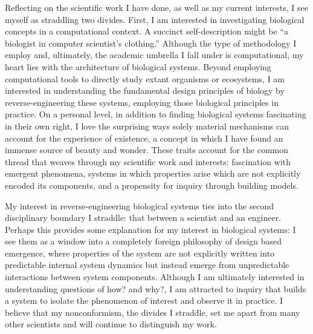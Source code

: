 \documentclass[12pt]{book}
\begin{document}
\maketitle


Reflecting on the scientific work I have done, as well as my current interests, I see myself as straddling two divides. First, I am interested in investigating biological concepts in a computational context. A succinct self-description might be “a biologist in computer scientist’s clothing.”  Although the type of methodology I employ and, ultimately, the academic umbrella I fall under is computational, my heart lies with the architecture of biological systems. Beyond employing computational tools to directly study extant organisms or ecosystems, I am interested in understanding the fundamental design principles of biology by reverse-engineering these systems, employing those biological principles in practice. On a personal level, in addition to finding biological systems fascinating in their own right, I love the surprising ways solely material mechanisms can account for the experience of existence, a concept in which I have found an immense source of beauty and wonder. These traits account for the common thread that weaves through my scientific work and interests: fascination with emergent phenomena, systems in which properties arise which are not explicitly encoded its components, and a propensity for inquiry through building models.

My interest in reverse-engineering biological systems ties into the second disciplinary boundary I straddle: that between a scientist and an engineer. Perhaps this provides some explanation for my interest in biological systems: I see them as a window into a completely foreign philosophy of design based emergence, where properties of the system are not explicitly written into predictable internal system dynamics but instead emerge from unpredictable interactions between system components. Although I am ultimately interested in understanding questions of how? and why?, I am attracted to inquiry that builds a system to isolate the phenomenon of interest and observe it in practice. I believe that my nonconformism, the divides I straddle, set me apart from many other scientists and will continue to distinguish my work.
\end{document}
